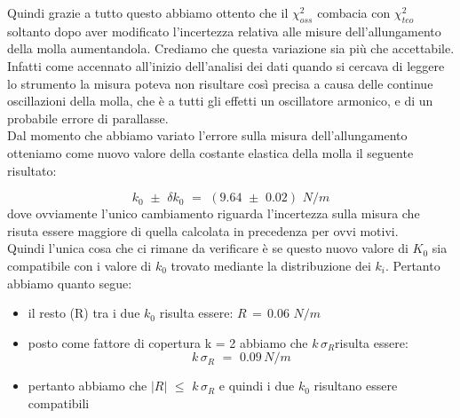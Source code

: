 Quindi grazie a tutto questo abbiamo ottento che il $\chi_{oss}^2$ combacia con $\chi_{teo}^2$ soltanto dopo aver modificato l'incertezza relativa alle misure dell'allungamento della molla aumentandola. Crediamo che questa variazione sia più che accettabile. Infatti come accennato all'inizio dell'analisi dei dati quando si cercava di leggere lo strumento la misura poteva non risultare così precisa a causa delle continue oscillazioni della molla, che è a tutti gli effetti un oscillatore armonico, e di un probabile errore di parallasse.\\
Dal momento che abbiamo variato l'errore sulla misura dell'allungamento otteniamo come nuovo valore della costante elastica della molla il seguente risultato:

\begin{equation*}
	k_0 \,\, \pm \,\, \delta k_0 \,\,=\,\, (9.64 \,\, \pm \,\, 0.02)\,\, N/m
\end{equation*}
%
dove ovviamente l'unico cambiamento riguarda l'incertezza sulla misura che risuta essere maggiore di quella calcolata in precedenza per ovvi motivi.\\

Quindi l'unica cosa che ci rimane da verificare è se questo nuovo valore di $K_0$ sia compatibile con i valore di $k_0$ trovato mediante la distribuzione dei $k_i$.
Pertanto abbiamo quanto segue:
\begin{itemize}
	\item{il resto (R) tra i due $k_0$ risulta essere: $R \,=\, 0.06 \,\, N/m$}
	\item{posto come fattore di copertura k = 2 abbiamo che $k \, \sigma_R$risulta essere:
			\begin{equation*}
				k \, \sigma_R \,\,=\,\, 0.09 \, N/m
			\end{equation*}}
	\item{pertanto abbiamo che $|R| \,\, \leq \,\, k \, \sigma_R $ e quindi i due $k_0$ risultano essere compatibili}
\end{itemize}

